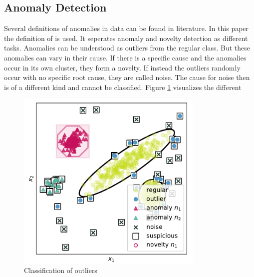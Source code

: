 \subsection{Anomaly Detection}
Several definitions of anomalies in data can be found in literature. In this paper the definition of \cite[p. 54]{gruhl_novelty_2022} is used. It seperates anomaly and novelty detection as different tasks. Anomalies can be understood as outliers from the regular class. But these anomalies can vary in their cause. If there is a specific cause and the anomalies occur in its own cluster, they form a novelty. If instead the outliers randomly occur with no specific root cause, they are called noise. The cause for noise then is of a different kind and cannot be classified. Figure \ref{fig_anomaly_gruhl} visualizes the different 
\begin{figure}[h!] %
  \centering
  \includegraphics[width=0.8\textwidth]{images/gruhl_anomaly_definition.png}
  \caption{Classification of outliers \cite[p. 54]{gruhl_novelty_2022}}
  \label{fig_anomaly_gruhl}
\end{figure}

